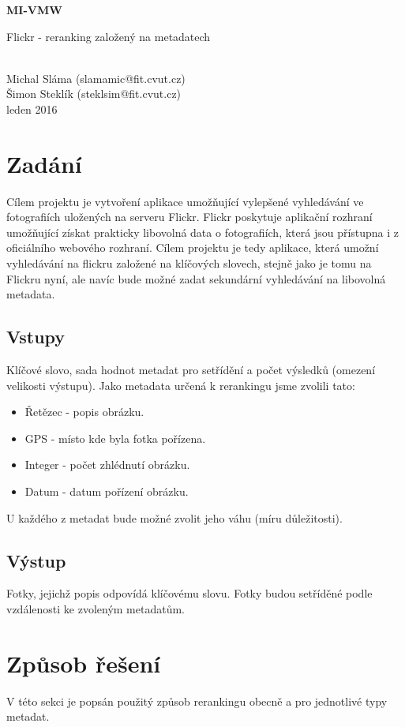 \documentclass[12pt,oneside,a4paper]{article}
\begin{document}
\begin{center}
\bf MI-VMW\\[2mm]
    \begin{Large}Flickr - reranking založený na metadatech\end{Large}\\[3mm]
       Michal Sláma (slamamic@fit.cvut.cz)\\
       Šimon Steklík (steklsim@fit.cvut.cz)\\
leden 2016
\end{center}

\section{Zadání}
Cílem projektu je vytvoření aplikace umožňující vylepšené vyhledávání ve fotografiích uložených na serveru
Flickr. Flickr poskytuje aplikační rozhraní umožňující získat prakticky libovolná data o fotografiích, která jsou
přístupna i z oficiálního webového rozhraní. Cílem projektu je tedy aplikace, která umožní vyhledávání na
flickru založené na klíčových slovech, stejně jako je tomu na Flickru nyní, ale navíc bude možné zadat
sekundární vyhledávání na libovolná metadata.

\subsection{Vstupy}
Klíčové slovo, sada hodnot metadat pro setřídění a počet výsledků (omezení velikosti výstupu).
Jako metadata určená k rerankingu jsme zvolili tato:
\begin{itemize}
	\item Řetězec - popis obrázku.
	\item GPS - místo kde byla fotka pořízena.
	\item Integer - počet zhlédnutí obrázku.
	\item Datum - datum pořízení obrázku.
\end{itemize}
U každého z metadat bude možné zvolit jeho váhu (míru důležitosti).

\subsection{Výstup}
Fotky, jejichž popis odpovídá klíčovému slovu. Fotky budou setříděné podle vzdálenosti ke zvoleným
metadatům.

\section{Způsob řešení}
V této sekci je popsán použitý způsob rerankingu obecně a pro jednotlivé typy metadat.
\end{document}
